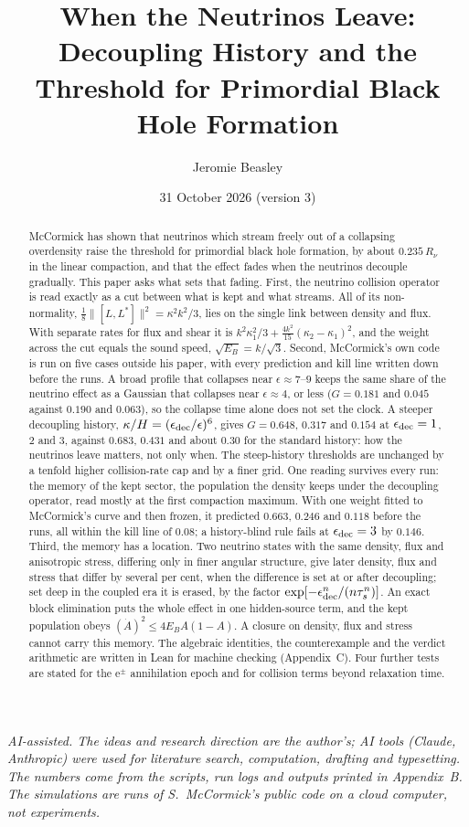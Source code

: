 \documentclass[11pt]{article}
\title{When the Neutrinos Leave:\\ Decoupling History and the Threshold for Primordial Black Hole Formation}
\author{Jeromie Beasley}
\date{31 October 2026 \quad (version 3)}
\begin{document}
\maketitle

\noindent\emph{AI-assisted. The ideas and research direction are the author's; AI tools (Claude, Anthropic) were used for literature search, computation, drafting and typesetting. The numbers come from the scripts, run logs and outputs printed in Appendix~B. The simulations are runs of S.~McCormick's public code on a cloud computer, not experiments.}

\begin{abstract}
McCormick has shown that neutrinos which stream freely out of a collapsing overdensity raise the threshold for primordial black hole formation, by about $0.235\,R_\nu$ in the linear compaction, and that the effect fades when the neutrinos decouple gradually. This paper asks what sets that fading. First, the neutrino collision operator is read exactly as a cut between what is kept and what streams. All of its non-normality, $\tfrac18\lVert[L,L^\ast]\rVert^2=\kappa^2k^2/3$, lies on the single link between density and flux. With separate rates for flux and shear it is $k^2\kappa_1^2/3+\tfrac{4k^2}{15}(\kappa_2-\kappa_1)^2$, and the weight across the cut equals the sound speed, $\sqrt{E_B}=k/\sqrt3$. Second, McCormick's own code is run on five cases outside his paper, with every prediction and kill line written down before the runs. A broad profile that collapses near $\epsilon\approx7$--$9$ keeps the same share of the neutrino effect as a Gaussian that collapses near $\epsilon\approx4$, or less ($G=0.181$ and $0.045$ against $0.190$ and $0.063$), so the collapse time alone does not set the clock. A steeper decoupling history, $\kappa/H=(\epsilon_{\rm dec}/\epsilon)^6$, gives $G=0.648$, $0.317$ and $0.154$ at $\epsilon_{\rm dec}=1$, $2$ and $3$, against $0.683$, $0.431$ and about $0.30$ for the standard history: how the neutrinos leave matters, not only when. The steep-history thresholds are unchanged by a tenfold higher collision-rate cap and by a finer grid. One reading survives every run: the memory of the kept sector, the population the density keeps under the decoupling operator, read mostly at the first compaction maximum. With one weight fitted to McCormick's curve and then frozen, it predicted $0.663$, $0.246$ and $0.118$ before the runs, all within the kill line of $0.08$; a history-blind rule fails at $\epsilon_{\rm dec}=3$ by $0.146$. Third, the memory has a location. Two neutrino states with the same density, flux and anisotropic stress, differing only in finer angular structure, give later density, flux and stress that differ by several per cent, when the difference is set at or after decoupling; set deep in the coupled era it is erased, by the factor $\exp[-\epsilon_{\rm dec}^n/(n\tau_s^n)]$. An exact block elimination puts the whole effect in one hidden-source term, and the kept population obeys $(\dot A)^2\le4E_BA(1-A)$. A closure on density, flux and stress cannot carry this memory. The algebraic identities, the counterexample and the verdict arithmetic are written in Lean for machine checking (Appendix~C). Four further tests are stated for the e$^\pm$ annihilation epoch and for collision terms beyond relaxation time.

\end{abstract}
\end{document}

